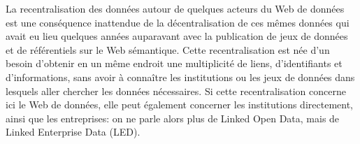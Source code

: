 La recentralisation des données autour de quelques acteurs du Web de données est une conséquence inattendue de la décentralisation de ces mêmes données qui avait eu lieu quelques années auparavant avec la publication de jeux de données et de référentiels sur le Web sémantique. Cette recentralisation est née d'un besoin d'obtenir en un même endroit une multiplicité de liens, d'identifiants et d'informations, sans avoir à connaître les institutions ou les jeux de données dans lesquels aller chercher les données nécessaires. Si cette recentralisation concerne ici le Web de données, elle peut également concerner les institutions directement, ainsi que les entreprises: on ne parle alors plus de Linked Open Data, mais de Linked Enterprise Data (LED).